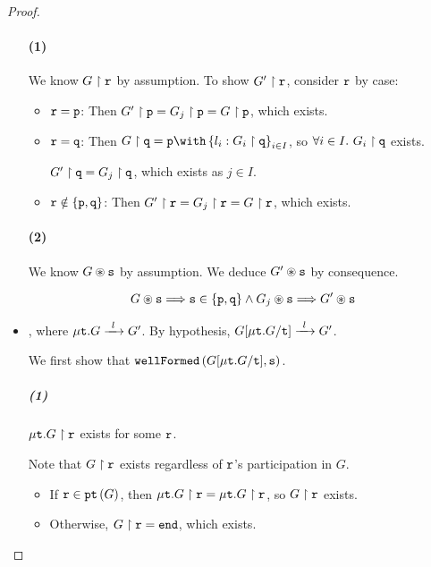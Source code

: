 \begin{proof}
\begin{itemize}
\paragraph{(1)}
We know ${G} \upharpoonright {\mathtt{r}}$ by assumption.
To show ${G'} \upharpoonright {\mathtt{r}}$, consider ${\mathtt{r}}$ by case:

\begin{itemize}
\item ${\mathtt{r}} = {\mathtt{p}}$:
Then ${G'} \upharpoonright {\mathtt{p}} = {G_j} \upharpoonright {\mathtt{p}} = {G} \upharpoonright {\mathtt{p}}$, which exists.

\item ${\mathtt{r}} = {\mathtt{q}}$:
Then $\proj{G}{q} = \tbra{p}{l_i: \proj{G_i}{q}}{i \in I}$,
so $\forall i \in I. ~ {G_i} \upharpoonright {\mathtt{q}}$ exists.

${G'} \upharpoonright {\mathtt{q}} = {G_j} \upharpoonright {\mathtt{q}}$, which exists as $j \in I$. 

\item ${\mathtt{r}} \notin \{ {\mathtt{p}}, {\mathtt{q}} \}$:
Then ${G'} \upharpoonright {\mathtt{r}} = {G_j} \upharpoonright {\mathtt{r}} = {G} \upharpoonright {\mathtt{r}}$,
which exists.

\end{itemize}

\paragraph{(2)}
We know ${G} \circledast {\mathtt{s}}$ by assumption.
We deduce ${G'} \circledast {\mathtt{s}}$ by consequence.

\[
{G} \circledast {\mathtt{s}} 
	\Longrightarrow 
		{\mathtt{s}} \in \{ {\mathtt{p}}, {\mathtt{q}} \} 
			\wedge 
		{G_j} \circledast {\mathtt{s}}
	\Longrightarrow
		{G'} \circledast {\mathtt{s}}
\]

\item {}, 
where $\treduce{\trec{G}}{G'}{l}$.
By hypothesis, $\treduce{G[\trec{G} / \trecvar]}{G'}{l}$.

We first show that $\textnormal{\texttt{wellFormed}}\left(G[\mu\textnormal{\texttt{t}}.{G} / \textnormal{\texttt{t}}], {\mathtt{s}}\right)$.

\subparagraph{(1)}
${\mu\textnormal{\texttt{t}}.{G}} \upharpoonright {\mathtt{r}}$ exists for some ${\mathtt{r}}$.

Note that ${G} \upharpoonright {\mathtt{r}}$ exists regardless of ${\mathtt{r}}$'s 
participation in $G$.

\begin{itemize}
\item 
If ${\mathtt{r}} \in {\textnormal{\texttt{pt}}\left({G}\right)}$, 
then ${\mu\textnormal{\texttt{t}}.{G}} \upharpoonright {\mathtt{r}} = \mu\textnormal{\texttt{t}}.{{G} \upharpoonright {\mathtt{r}}}$,
so ${G} \upharpoonright {\mathtt{r}}$ exists.

\item 
Otherwise, ${G} \upharpoonright {\mathtt{r}} = \textnormal{\texttt{end}}$, which exists.
\end{itemize}


\end{itemize}
\end{proof}
